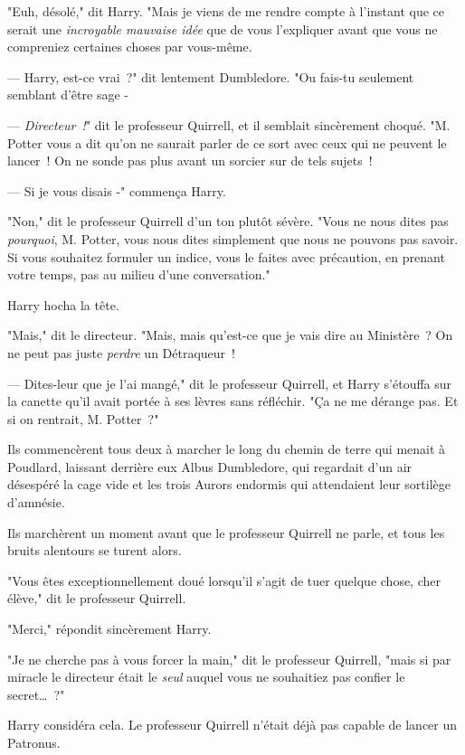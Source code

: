 "Euh, désolé," dit Harry. "Mais je viens de me rendre compte à l'instant que ce serait une \emph{incroyable mauvaise idée} que de vous l'expliquer avant que vous ne compreniez certaines choses par vous-même.

--- Harry, est-ce vrai~?" dit lentement Dumbledore. "Ou fais-tu seulement semblant d'être sage -

--- \emph{Directeur~!}" dit le professeur Quirrell, et il semblait sincèrement choqué. "M. Potter vous a dit qu'on ne saurait parler de ce sort avec ceux qui ne peuvent le lancer~! On ne sonde pas plus avant un sorcier sur de tels sujets~!

--- Si je vous disais -" commença Harry.

"Non," dit le professeur Quirrell d'un ton plutôt sévère. "Vous ne nous dites pas \emph{pourquoi}, M. Potter, vous nous dites simplement que nous ne pouvons pas savoir. Si vous souhaitez formuler un indice, vous le faites avec précaution, en prenant votre temps, pas au milieu d'une conversation."

Harry hocha la tête.

"Mais," dit le directeur. "Mais, mais qu'est-ce que je vais dire au Ministère~? On ne peut pas juste \emph{perdre} un Détraqueur~!

--- Dites-leur que je l'ai mangé," dit le professeur Quirrell, et Harry s'étouffa sur la canette qu'il avait portée à ses lèvres sans réfléchir. "Ça ne me dérange pas. Et si on rentrait, M. Potter~?"

Ils commencèrent tous deux à marcher le long du chemin de terre qui menait à Poudlard, laissant derrière eux Albus Dumbledore, qui regardait d'un air désespéré la cage vide et les trois Aurors endormis qui attendaient leur sortilège d'amnésie.


Ils marchèrent un moment avant que le professeur Quirrell ne parle, et tous les bruits alentours se turent alors.

"Vous êtes exceptionnellement doué lorsqu'il s'agit de tuer quelque chose, cher élève," dit le professeur Quirrell.

"Merci," répondit sincèrement Harry.

"Je ne cherche pas à vous forcer la main," dit le professeur Quirrell, "mais si par miracle le directeur était le \emph{seul} auquel vous ne souhaitiez pas confier le secret…~?"

Harry considéra cela. Le professeur Quirrell n'était déjà pas capable de lancer un Patronus.

